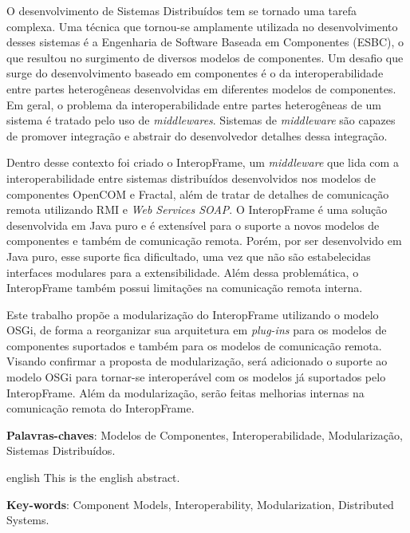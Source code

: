 \documentclass[
	12pt,				%
	oneside,			%
	a4paper,			%
	english,			%
	brazil				%
	]{abntex2}
\begin{document}
\setlength{\absparsep}{18pt} %
\begin{resumo}
 O desenvolvimento de Sistemas Distribu\'idos tem se tornado uma tarefa complexa. Uma t\'ecnica que tornou-se amplamente utilizada no desenvolvimento desses sistemas \'e a Engenharia de Software Baseada em Componentes (ESBC), o que resultou no surgimento de diversos modelos de componentes. Um desafio que surge do desenvolvimento baseado em componentes \'e o da interoperabilidade entre partes heterog\^eneas desenvolvidas em diferentes modelos de componentes. Em geral, o problema da interoperabilidade entre partes heterog\^eneas de um sistema \'e tratado pelo uso de \textit{middlewares}. Sistemas de \textit{middleware} s\~ao capazes de promover integra\c{c}\~ao e abstrair do desenvolvedor detalhes dessa integra\c{c}\~ao.

Dentro desse contexto foi criado o InteropFrame, um \textit{middleware} que lida com a interoperabilidade entre sistemas distribu\'idos desenvolvidos nos modelos de componentes OpenCOM e Fractal, al\'em de tratar de detalhes de comunica\c{c}\~ao remota utilizando RMI e \textit{Web Services SOAP}. O InteropFrame \'e uma solu\c{c}\~ao desenvolvida em Java puro e \'e extens\'ivel para o suporte a novos modelos de componentes e tamb\'em de comunica\c{c}\~ao remota. Por\'em, por ser desenvolvido em Java puro, esse suporte fica dificultado, uma vez que n\~ao s\~ao estabelecidas interfaces modulares para a extensibilidade. Al\'em dessa problem\'atica, o InteropFrame tamb\'em possui limita\c{c}\~oes na comunica\c{c}\~ao remota interna.

Este trabalho prop\~oe a modulariza\c{c}\~ao do InteropFrame utilizando o modelo OSGi, de forma a reorganizar sua arquitetura em \textit{plug-ins} para os modelos de componentes suportados e tamb\'em para os modelos de comunica\c{c}\~ao remota. Visando confirmar a proposta de modulariza\c{c}\~ao, ser\'a adicionado o suporte ao modelo OSGi para tornar-se interoper\'avel com os modelos j\'a suportados pelo InteropFrame. Al\'em da modulariza\c{c}\~ao, ser\~ao feitas melhorias internas na comunica\c{c}\~ao remota do InteropFrame.

 \textbf{Palavras-chaves}: Modelos de Componentes, Interoperabilidade, Modulariza\c{c}\~ao, Sistemas Distribu\'idos.
\end{resumo}

\begin{resumo}[Abstract]
 \begin{otherlanguage*}{english}
   This is the english abstract.

   \vspace{\onelineskip}
 
   \noindent 
   \textbf{Key-words}: Component Models, Interoperability, Modularization, Distributed Systems.
 \end{otherlanguage*}
\end{resumo}
\end{document}
